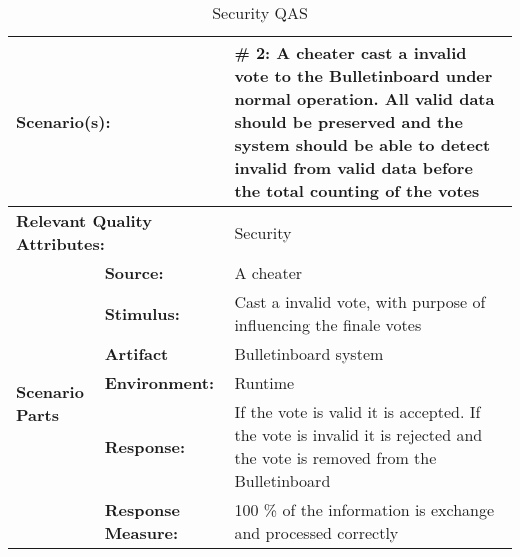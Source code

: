 \begin{table}[H]
\begin{center}
\begin{tabular}{|p{0.3cm}|p{2.5cm}|p{8cm}|}
  \hline
  \multicolumn{2}{|p{3cm}|}{\bfseries Scenario(s):} & \#  2: A cheater cast a invalid vote to the Bulletinboard under normal operation. All valid data should be preserved and the system should be able to detect invalid from  valid data before the total counting of the votes\\
  \hline
  \multicolumn{2}{|p{3cm}|}{\bfseries Relevant Quality Attributes:} & Security\\
  \hline
  \multirow{6}{*}{\begin{sideways}{\bfseries Scenario Parts}\end{sideways}}
  & {\bfseries Source:} & A cheater \\
  \cline{2-3}
  & {\bfseries Stimulus:} & Cast a invalid vote, with purpose of influencing the finale votes \\
  \cline{2-3}
  & {\bfseries Artifact} &  Bulletinboard system \\
  \cline{2-3}
  & {\bfseries Environment:} &  Runtime \\
  \cline{2-3}
  & {\bfseries Response:} &  If the vote is valid it is accepted. If the vote is invalid it is rejected and the vote is removed from the Bulletinboard \\
  \cline{2-3}
  & {\bfseries Response Measure:} & 100 \% of the information is exchange and processed correctly \\
  \hline
\end{tabular}
\caption{Security QAS}
\end{center}
\end{table}


